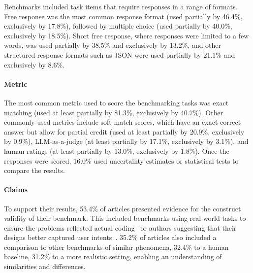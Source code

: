 Benchmarks included task items that require responses in a range of formats. Free response was the most common response format (used partially by 46.4\%, exclusively by 17.8\%), followed by multiple choice (used partially by 40.0\%, exclusively by 18.5\%). Short free response, where responses were limited to a few words, was used partially by 38.5\% and exclusively by 13.2\%, and other structured response formats such as JSON  were used partially by 21.1\% and exclusively by 8.6\%.



\paragraph{\textcolor{metric}{Metric}} 
The most common metric used to score the benchmarking tasks was exact matching (used at least partially by 81.3\%, exclusively by 40.7\%). Other commonly used metrics include soft match scores, which have an exact correct answer but allow for partial credit (used at least partially by 20.9\%, exclusively by 0.9\%), LLM-as-a-judge (at least partially by 17.1\%, exclusively by 3.1\%), and human ratings (at least partially by 13.0\%, exclusively by 1.8\%). Once the responses were scored, 16.0\% used uncertainty estimates or statistical tests to compare the results.




\paragraph{\textcolor{claims}{Claims}}

To support their results, 53.4\% of articles presented evidence for the construct validity of their benchmark. This included benchmarks using real-world tasks to ensure the problems reflected actual coding~\cite{huangDAcodeAgentData2024} or authors suggesting that their designs better captured user intents~\cite{wangUsercentricMultiintentBenchmark2024}. 35.2\% of articles also included a comparison to other benchmarks of similar phenomena, 32.4\% to a human baseline, 31.2\% to a more realistic setting, enabling an understanding of similarities and differences.